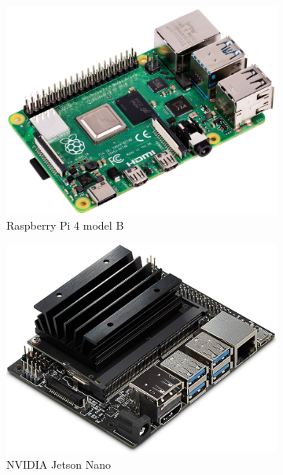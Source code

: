 \begin{figure}[H]
    \begin{subfigure}{0.24\textwidth}
    \centering
        \includegraphics[width=\textwidth]{Images/Hardware/rpi-4b.png}
        \caption{Raspberry Pi 4 model B}
        \label{fig:rasp_pi_3A+}
    \end{subfigure}
    \hfill
    \begin{subfigure}{0.24\textwidth}
        \includegraphics[width=\textwidth]{Images/Hardware/jetsonnano.png}
        \caption{NVIDIA Jetson Nano}
        \label{fig:jetson_nano}
    \end{subfigure}
    \hfill
    \begin{subfigure}{0.24\textwidth}

\end{subfigure}
\end{figure}
